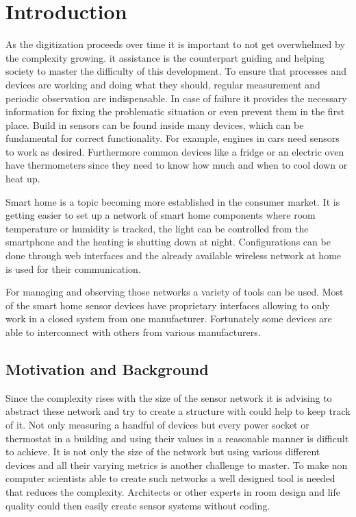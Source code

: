 \chapter{Introduction}
As the digitization proceeds over time it is important to not get overwhelmed by the complexity growing. \gls{it} assistance is the counterpart guiding and helping society to master the difficulty of this development. To ensure that processes and devices are working and doing what they should, regular measurement and periodic observation are indispensable. In case of failure it provides the necessary information for fixing the problematic situation or even prevent them in the first place. Build in sensors can be found inside many devices, which can be fundamental for correct functionality. For example, engines in cars need sensors to work as desired. Furthermore common devices like a fridge or an electric oven have thermometers since they need to know how much and when to cool down or heat up. 

Smart home is a topic becoming more established in the consumer market. It is getting easier to set up a network of smart home components where room temperature or humidity is tracked, the light can be controlled from the smartphone and the heating is shutting down at night. Configurations can be done through web interfaces and the already available wireless network at home is used for their communication.

For managing and observing those networks a variety of tools can be used. Most of the smart home sensor devices have proprietary interfaces allowing to only work in a closed system from one manufacturer. Fortunately some devices are able to interconnect with others from various manufacturers. 

\section{Motivation and Background}
Since the complexity rises with the size of the sensor network it is advising to abstract these network and try to create a structure with could help to keep track of it. Not only measuring a handful of devices but every power socket or thermostat in a building and using their values in a reasonable manner is difficult to achieve. It is not only the size of the network but using various different devices and all their varying metrics is another challenge to master. To make non computer scientists able to create such networks a well designed tool is needed that reduces the complexity. Architects or other experts in room design and life quality could then easily create sensor systems without coding.

